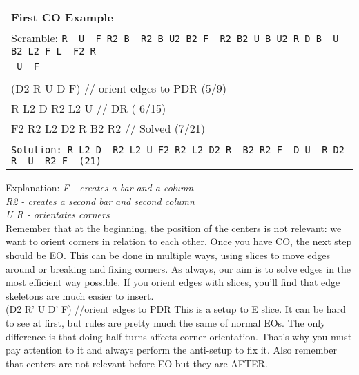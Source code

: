 \documentclass[11pt,a4paper]{book}
\newcommand{\p}{\textquotesingle}
\newcommand{\m}{\texttt}
\newcommand{\ps}{\p\,\,}
\newcommand{\comment}[1]{{\color{gray}\quad//#1}}
\begin{document}
\bigskip
\begin{tabular}{|l|}
\hline
\textbf{First CO Example }\\
\hline
Scramble: \m{R\ps U\ps F R2 B\ps R2 B U2 B2 F\ps R2 B2 U B U2 R D B\ps U B2 L2 F L\ps F2 R\ps}\\ \m{          U\ps F}\\
\hline
\begin{minipage}[l]{0.650\textwidth}
\bigskip
\m{(F R2 U R)\comment{ orient R/L corners (4/4)}\\
(D2 R\ps U D\ps F) \comment{ orient edges to PDR (5/9) }\\
R L2 D\ps R2 L2 U \comment{ DR ( 6/15) }\\
F2 R2 L2 D2 R\ps B2 R2 \comment{ Solved (7/21) }\\
}
\bigskip
\bigskip
\end{minipage}
\begin{minipage}[c]{0.25\textwidth}
\centering
\def\svgwidth{\columnwidth}

\end{minipage}\\
\hline
\m{Solution: R L2 D\ps R2 L2 U F2 R2 L2 D2 R\ps B2 R2 F\ps D U\ps R D2 R\ps U\ps R2 F\ps (21)}\\
\hline
\end{tabular}
\hfill \break
\newpage
Explanation:
\newline
\textit{F - creates a bar and a column\\
R2 - creates a second bar and second column\\
U R - orientates corners}\\
\newline
Remember that at the beginning, the position of the centers is not relevant: we want to orient corners in relation to each other.
Once you have CO, the next step should be EO. This can be done in multiple ways, using slices to move edges around or breaking and fixing corners. As always, our aim is to solve edges in the most efficient way possible. 
If you orient edges with slices, you’ll find that edge skeletons are much easier to insert.\\
\newline
(D2 R' U D' F) \comment{orient edges to PDR}
\newline
This is a setup to E slice. It can be hard to see at first, but rules are pretty much the same of normal EOs. The only difference is that doing half turns affects corner orientation. That’s why you must pay attention to it and always perform the anti-setup to fix it. Also remember that centers are not relevant before EO but they are AFTER.\\
\end{document}
